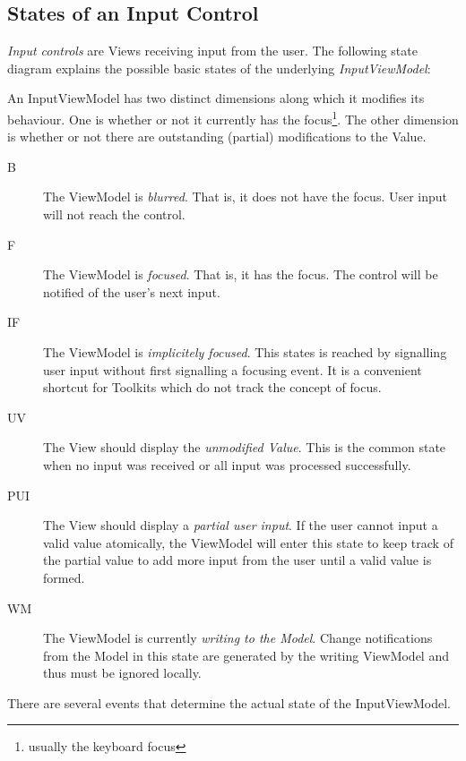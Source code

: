\subsection{States of an Input Control}

\emph{Input controls} are Views receiving input from the user. The following state diagram 
explains the possible basic states of the underlying \emph{InputViewModel}:


An InputViewModel has two distinct dimensions along which it modifies its behaviour. One is 
whether or not it currently has the focus\footnote{usually the keyboard focus}. The other 
dimension is whether or not there are outstanding (partial) modifications to the Value.

\begin{description}
\item[B] {The ViewModel is \emph{blurred}. That is, it does not have the focus. User input will not reach the control.}
\item[F] {The ViewModel is \emph{focused}. That is, it has the focus. The control will be notified of the user's next input.}
\item[IF] {The ViewModel is \emph{implicitely focused}. This states is reached by signalling user input without first signalling a focusing event. It is a convenient shortcut for Toolkits which do not track the concept of focus.}

\item[UV] {The View should display the \emph{unmodified Value}. This is the common state when no input was received or all input was processed successfully.}
\item[PUI] {The View should display a \emph{partial user input}. If the user cannot input a valid value atomically, the ViewModel will enter this state to keep track of the partial value to add more input from the user until a valid value is formed.}
\item[WM] {The ViewModel is currently \emph{writing to the Model}. Change notifications from the Model in this state are generated by the writing ViewModel and thus must be ignored locally.}
\end{description}

There are several events that determine the actual state of the InputViewModel.

